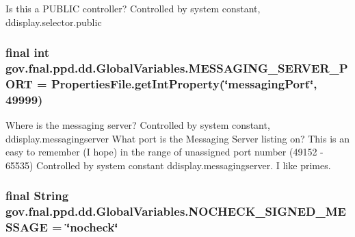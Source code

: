 Is this a P\-U\-B\-L\-I\-C controller? Controlled by system constant, ddisplay.\-selector.\-public \hypertarget{classgov_1_1fnal_1_1ppd_1_1dd_1_1GlobalVariables_a3afb8f4fd1dbbc82329ea9ff4aa3629e}{
\subsubsection[{M\-E\-S\-S\-A\-G\-I\-N\-G\-\_\-\-S\-E\-R\-V\-E\-R\-\_\-\-P\-O\-R\-T}]{\setlength{\rightskip}{0pt plus 5cm}final int gov.\-fnal.\-ppd.\-dd.\-Global\-Variables.\-M\-E\-S\-S\-A\-G\-I\-N\-G\-\_\-\-S\-E\-R\-V\-E\-R\-\_\-\-P\-O\-R\-T = {\bf Properties\-File.\-get\-Int\-Property}(\char`\"{}messaging\-Port\char`\"{}, 49999)\hspace{0.3cm}{\ttfamily [static]}}}\label{classgov_1_1fnal_1_1ppd_1_1dd_1_1GlobalVariables_a3afb8f4fd1dbbc82329ea9ff4aa3629e}
Where is the messaging server? Controlled by system constant, ddisplay.\-messagingserver What port is the Messaging Server listing on? This is an easy to remember (I hope) in the range of unassigned port number (49152 -\/ 65535) Controlled by system constant ddisplay.\-messagingserver. I like primes. \hypertarget{classgov_1_1fnal_1_1ppd_1_1dd_1_1GlobalVariables_a83097f18e0ffe08a8a7ae97f883ee471}{
\subsubsection[{N\-O\-C\-H\-E\-C\-K\-\_\-\-S\-I\-G\-N\-E\-D\-\_\-\-M\-E\-S\-S\-A\-G\-E}]{\setlength{\rightskip}{0pt plus 5cm}final String gov.\-fnal.\-ppd.\-dd.\-Global\-Variables.\-N\-O\-C\-H\-E\-C\-K\-\_\-\-S\-I\-G\-N\-E\-D\-\_\-\-M\-E\-S\-S\-A\-G\-E = \char`\"{}nocheck\char`\"{}\hspace{0.3cm}{\ttfamily [static]}}}\label{classgov_1_1fnal_1_1ppd_1_1dd_1_1GlobalVariables_a83097f18e0ffe08a8a7ae97f883ee471}
